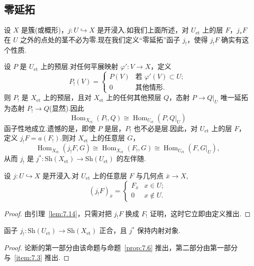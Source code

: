 \subsection*{零延拓}

设 $X$ 是簇(或概形)，$j \colon U \hookrightarrow X$ 是开浸入.如我们上面所述，对 $U_{\mathrm{et}}$ 上的层 $F$，$j_{*}F$ 在 $U$ 之外的点处的茎不必为零.现在我们定义``零延拓''函子 $j_{!}$，使得 $j_{!}F$ 确实有这个性质.

设 $P$ 是 $U_{\mathrm{et}}$ 上的预层.对任何平展映射 $\varphi' \colon V \to X$，定义
\[
P_{!}(V) = \begin{cases}
P(V) & \text{若 } \varphi'(V) \subset U;\\
0 & \text{其他情形}.
\end{cases}
\]
则 $P_{!}$ 是 $X_{\mathrm{et}}$ 上的预层，且对 $X_{\mathrm{et}}$ 上的任何其他预层 $Q$，态射 $P \to Q|_{U}$ 唯一延拓为态射 $P_{!} \to Q$(显然).因此
\[
\operatorname{Hom}_{X_{\mathrm{et}}}(P_{!}, Q) \cong \operatorname{Hom}_{U_{\mathrm{et}}}(P, Q|_{U})
\]
函子性地成立.遗憾的是，即使 $P$ 是层，$P_{!}$ 也不必是层.因此，对 $U_{\mathrm{et}}$ 上的层 $F$，定义 $j_{!}F = a(F_{!})$.则对 $X_{\mathrm{et}}$ 上的任意层 $G$，
\[
\operatorname{Hom}_{X_{\mathrm{et}}}(j_{!}F, G) \cong \operatorname{Hom}_{X_{\mathrm{et}}}(F_{!}, G) \cong \operatorname{Hom}_{U_{\mathrm{et}}}(F, G|_{U}),
\]
从而 $j_{!}$ 是 $j^{*} \colon \mathrm{Sh}(X_{\mathrm{et}}) \to \mathrm{Sh}(U_{\mathrm{et}})$ 的左伴随.

\begin{proposition}\label{prop:8.13}
设 $j \colon U \hookrightarrow X$ 是开浸入.对 $U_{\mathrm{et}}$ 上的任意层 $F$ 与几何点 $\bar{x} \to X$,
\[
(j_{!}F)_{\bar{x}} = \begin{cases}
F_{\bar{x}} & x \in U;\\
0 & x \notin U.
\end{cases}
\]
\end{proposition}

\begin{proof}
由引理~\ref{lem:7.14}，只需对把 $j_{!}F$ 换成 $F_{!}$ 证明，这时它立即由定义推出.
\end{proof}

\begin{corollary}\label{cor:8.14}
函子 $j_{!} \colon \mathrm{Sh}(U_{\mathrm{et}}) \to \mathrm{Sh}(X_{\mathrm{et}})$ 正合，且 $j^{*}$ 保持内射对象.
\end{corollary}

\begin{proof}
论断的第一部分由该命题与命题~\ref{prop:7.6} 推出，第二部分由第一部分与~\ref{item:7.3} 推出.
\end{proof}

